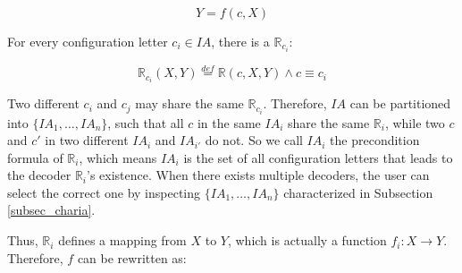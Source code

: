 \documentclass[journal]{IEEEtran}
\begin{document}
\begin{equation}\label{equ_fdf}
Y=f(c,X)
\end{equation}

For every configuration letter $c_i\in IA$,
there is a $\mathbb{R}_{c_i}$:

\begin{equation}\label{equ_fdRci}
\mathbb{R}_{c_i}(X,Y)\stackrel{def}{=}\mathbb{R}(c,X,Y) \wedge c\equiv c_i
\end{equation}

%
%
%
%
%
%
Two different $c_i$ and $c_j$ may share the same $\mathbb{R}_{c_i}$.
%
Therefore,
$IA$ can be partitioned into $\{IA_1,\dots,IA_n\}$,
such that all $c$ in the same $IA_i$ share the same $\mathbb{R}_i$,
while two $c$ and $c'$ in two different $IA_i$ and $IA_{i'}$ do not.
So we call $IA_i$ the precondition formula of $\mathbb{R}_i$,
which means $IA_i$ is the set of all configuration letters that leads to the decoder $\mathbb{R}_i$'s existence.
When there exists multiple decoders,
the user can select the correct one by inspecting $\{IA_1,\dots,IA_n\}$ characterized in Subsection \ref{subsec_charia}.


Thus,
$\mathbb{R}_i$ defines a mapping from $X$ to $Y$,
which is actually a function $f_i:X\to Y$.
Therefore,
$f$ can be rewritten as:
\end{document}

